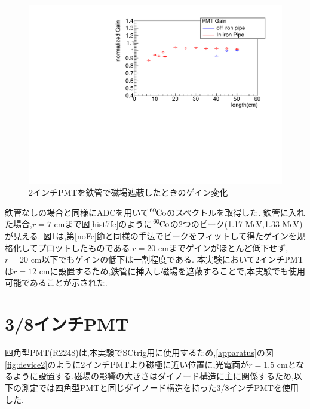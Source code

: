 \begin{figure}[tbp]
	\centering
		\includegraphics[angle=-90,width=15cm]{fig/iguchi/bigPMTfit.pdf}
	\caption{2インチPMTを鉄管で磁場遮蔽したときのゲイン変化}
	\label{bigPMTfit}
\end{figure}

鉄管なしの場合と同様にADCを用いて$\ce{^{60}Co}$のスペクトルを取得した.
鉄管に入れた場合,$r=7$ cmまで図\ref{hist7fe}のように$\ce{^{60}Co}$の2つのピーク(1.17 MeV,1.33 MeV)が見える.
図\ref{bigPMTfit}は,第\ref{noFe}節と同様の手法でピークをフィットして得たゲインを規格化してプロットしたものである.$r=20$ cmまでゲインがほとんど低下せず,$r=20$ cm以下でもゲインの低下は一割程度である.
本実験において2インチPMTは$r=12$ cmに設置するため,鉄管に挿入し磁場を遮蔽することで,本実験でも使用可能であることが示された.


\newpage
\section{3/8インチPMT}
四角型PMT(R2248)\cite{pmtR2248}は,本実験でSCtrig用に使用するため,\ref{apparatus}の図\ref{fig:device2}のように2インチPMTより磁極に近い位置に,光電面が$r=1.5$ cmとなるように設置する.磁場の影響の大きさはダイノード構造に主に関係するため,以下の測定では四角型PMTと同じダイノード構造を持った3/8インチPMT\cite{pmtH3164-10}を使用した.

